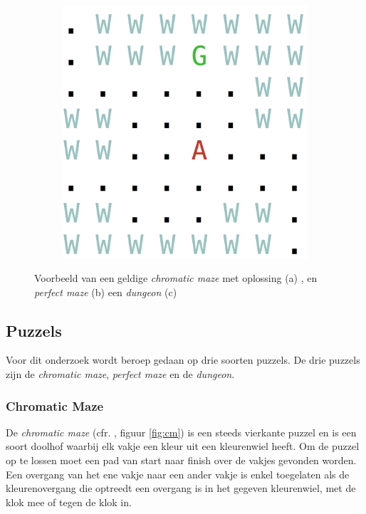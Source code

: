 \documentclass{article}
\begin{document}
\begin{figure}[t]
\hspace{.085\textwidth}
\begin{subfigure}{.18\textwidth}
  \centering
  \includegraphics[width=\linewidth]{Images/dungeon.png}
  \caption{}
  \label{fig:dung}
\end{subfigure}
\caption{Voorbeeld van een geldige \textit{chromatic maze} met oplossing (a) , en \textit{perfect maze} (b) een \textit{dungeon} (c)}
\label{fig:test}
\end{figure}	

	\subsection{Puzzels}
	Voor dit onderzoek wordt beroep gedaan op drie soorten puzzels. De drie puzzels zijn de \textit{chromatic maze}, \textit{perfect maze} en de \textit{dungeon}. 
	\subsubsection*{Chromatic Maze}
	De \textit{chromatic maze} (cfr. \cite{journals/tciaig/SmithM11}, figuur \ref{fig:cm}) is een steeds vierkante puzzel en is een soort doolhof waarbij  elk vakje een kleur uit een kleurenwiel heeft. Om de puzzel op te lossen moet een pad van start naar finish over de vakjes gevonden worden. Een overgang van het ene vakje naar een ander vakje is enkel toegelaten als de kleurenovergang die optreedt een overgang is in het gegeven kleurenwiel, met de klok mee of tegen de klok in.
	
\end{document}
